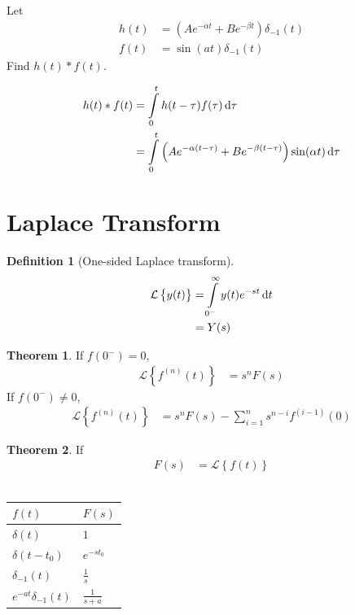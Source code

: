 \documentclass[fleqn, a4paper, 12pt, twoside]{article}
\theoremstyle{definition}
\newtheorem{definition}{Definition}
\theoremstyle{theorem}
\newtheorem{theorem}{Theorem}
\begin{document}
\begin{question}
	Let
	\begin{align*}
		h(t) & = \left( A e^{-\alpha t} + B e^{-\beta t} \right) \delta_{-1}(t) \\
		f(t) & = \sin(a t) \delta_{-1}(t)
	\end{align*}
	Find $h(t) \ast f(t)$.
\end{question}

\begin{solution}
	\begin{align*}
		h(t) \ast f(t) & = \int\limits_{0}^{t} h(t - \tau) f(\tau) \dif \tau \\
                               & = \int\limits_{0}^{t} \left( A e^{-\alpha (t - \tau)} + B e^{-\beta (t - \tau) } \right) \sin(\alpha t) \dif \tau
	\end{align*}
\end{solution}

\section{Laplace Transform}

\begin{definition}[One-sided Laplace transform]
	\begin{align*}
		\mathcal{L}\left\{ y(t) \right\} & = \int\limits_{0^-}^{\infty} y(t) e^{-s t}\dif t \\
                                                 & = Y(s)
	\end{align*}
\end{definition}

\begin{theorem}
	If $f(0^-) = 0$,
	\begin{align*}
		\mathcal{L}\left\{ f^{(n)}(t) \right\} & = s^n F(s)
	\end{align*}
	If $f(0^-) \neq 0$,
	\begin{align*}
		\mathcal{L}\left\{ f^{(n)}(t) \right\} & = s^n F(s) - \sum\limits_{i = 1}^{n} s^{n - i} f^{(i - 1)}(0)
	\end{align*}
\end{theorem}

\begin{theorem}
	If
	\begin{align*}
		F(s) & = \mathcal{L}\left\{ f(t) \right\}
	\end{align*}
	~\\
	\begin{table}[H]
		\begin{tabular}{|l|l|}
			\hline
			$f(t)$ & $F(s)$\\
			\hline
			$\delta(t)$ & $1$\\
			$\delta(t - t_0)$ & $e^{-s t_0}$\\
			$\delta_{-1}(t)$ & $\frac{1}{s}$\\
			$e^{-a t} \delta_{-1}(t)$ & $\frac{1}{s + a}$\\
			\hline
		\end{tabular}
	\end{table}
\end{theorem}
\end{document}
